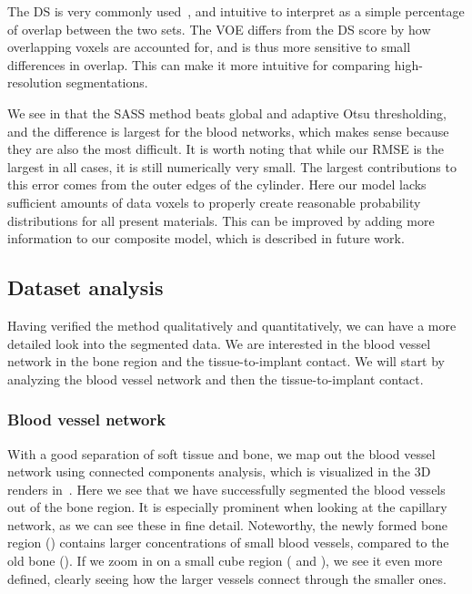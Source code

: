 The DS is very commonly used~\cite{evaluation_review}, and intuitive to
interpret as a simple percentage of overlap between the two sets. The VOE
differs from the DS score by how overlapping voxels are accounted for, and is
thus more sensitive to small differences in overlap. This can make it more
intuitive for comparing high-resolution segmentations.

We see in  that the SASS method beats global and adaptive Otsu thresholding,
and the difference is largest for the blood networks, which makes sense because
they are also the most difficult.
It is worth noting that while our RMSE is the
largest in all cases, it is still numerically very small. The largest
contributions to this error comes from the outer edges of the cylinder. Here
our model lacks sufficient amounts of data voxels to properly create reasonable
probability distributions for all present materials. This can be improved by
adding more information to our composite model, which is described in future
work.


\subsection{Dataset analysis}

Having verified the method qualitatively and quantitatively, we can have a more
detailed look into the segmented data. We are interested in the blood vessel
network in the bone region and the tissue-to-implant contact. We will start by
analyzing the blood vessel network and then the tissue-to-implant contact.

\subsubsection{Blood vessel network}
\label{sec:blood-network}

With a good separation of soft tissue and bone, we map out the blood vessel
network using connected components analysis, which is visualized in the 3D
renders in~. Here we see that we have successfully
segmented the blood vessels out of the bone region. It is especially prominent
when looking at the capillary network, as we can see these in fine detail.
Noteworthy, the newly formed bone region () contains
larger concentrations of small blood vessels, compared to the old bone
(). If we zoom in on a small cube region
( and ), we see it even more
defined, clearly seeing how the larger vessels connect through the smaller
ones.

